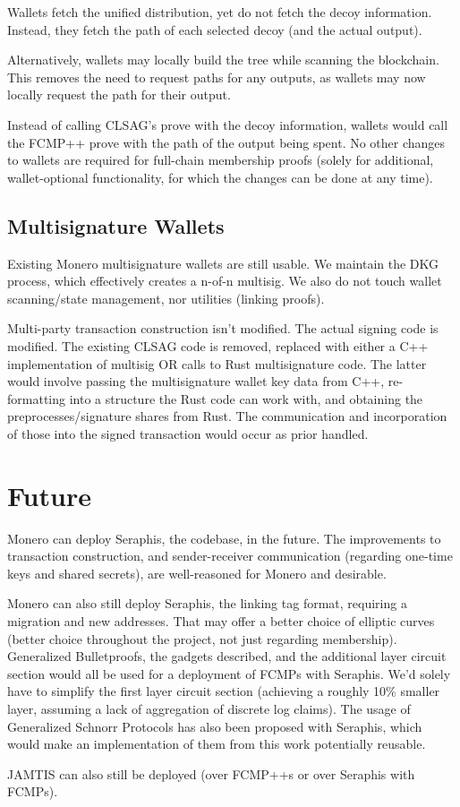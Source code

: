 \documentclass[]{article}
\begin{document}
Wallets fetch the unified distribution, yet do not fetch the decoy information. Instead, they fetch the path of each selected decoy (and the actual output).

Alternatively, wallets may locally build the tree while scanning the blockchain. This removes the need to request paths for any outputs, as wallets may now locally request the path for their output.

Instead of calling CLSAG's prove with the decoy information, wallets would call the FCMP++ prove with the path of the output being spent. No other changes to wallets are required for full-chain membership proofs (solely for additional, wallet-optional functionality, for which the changes can be done at any time).

\subsection{Multisignature Wallets}

Existing Monero multisignature wallets are still usable. We maintain the DKG process, which effectively creates a n-of-n multisig. We also do not touch wallet scanning/state management, nor utilities (linking proofs).

Multi-party transaction construction isn't modified. The actual signing code is modified. The existing CLSAG code is removed, replaced with either a C++ implementation of multisig OR calls to Rust multisignature code. The latter would involve passing the multisignature wallet key data from C++, re-formatting into a structure the Rust code can work with, and obtaining the preprocesses/signature shares from Rust. The communication and incorporation of those into the signed transaction would occur as prior handled.

\newpage

\section{Future}

Monero can deploy Seraphis, the codebase, in the future. The improvements to transaction construction, and sender-receiver communication (regarding one-time keys and shared secrets), are well-reasoned for Monero and desirable.

Monero can also still deploy Seraphis, the linking tag format, requiring a migration and new addresses. That may offer a better choice of elliptic curves (better choice throughout the project, not just regarding membership). Generalized Bulletproofs, the gadgets described, and the additional layer circuit section would all be used for a deployment of FCMPs with Seraphis. We'd solely have to simplify the first layer circuit section (achieving a roughly 10\% smaller layer, assuming a lack of aggregation of discrete log claims). The usage of Generalized Schnorr Protocols has also been proposed with Seraphis, which would make an implementation of them from this work potentially reusable.

JAMTIS can also still be deployed (over FCMP++s or over Seraphis with FCMPs).
\end{document}
